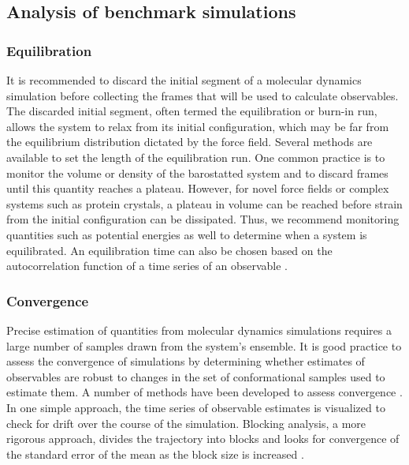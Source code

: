 \documentclass[9pt,review,pubversion]{livecoms}
\begin{document}
\vfill\break %
\subsection{Analysis of benchmark simulations}
\label{sub:best_practices_analysis}

\subsubsection{Equilibration}
\label{sub2:equilibration}

It is recommended to discard the initial segment of a molecular dynamics simulation before collecting the frames that will be used to calculate observables.
The discarded initial segment, often termed the equilibration or burn-in run, allows the system to relax from its initial configuration, which may be far from the equilibrium distribution dictated by the force field.
Several methods are available to set the length of the equilibration run.
One common practice is to monitor the volume or density of the barostatted system and to discard frames until this quantity reaches a plateau.
However, for novel force fields or complex systems such as protein crystals, a plateau in volume can be reached before strain from the initial configuration can be dissipated.
Thus, we recommend monitoring quantities such as potential energies as well to determine when a system is equilibrated.
An equilibration time can also be chosen based on the autocorrelation function of a time series of an observable \cite{chodera_simple_2016}.

\subsubsection{Convergence}
\label{sub2:convergence}

Precise estimation of quantities from molecular dynamics simulations requires a large number of samples drawn from the system's ensemble.
It is good practice to assess the convergence of simulations by determining whether estimates of observables are robust to changes in the set of conformational samples used to estimate them.
A number of methods have been developed to assess convergence \cite{grossfield_best_2019}.
In one simple approach, the time series of observable estimates is visualized to check for drift over the course of the simulation.
Blocking analysis, a more rigorous approach, divides the trajectory into blocks and looks for convergence of the standard error of the mean as the block size is increased \cite{flyvbjerg_error_1989}.
\end{document}

